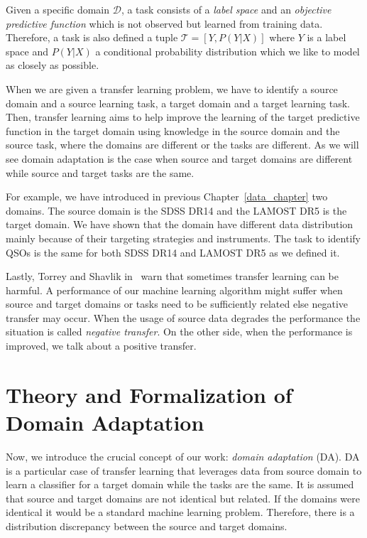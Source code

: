 Given a specific domain \(\mathcal{D}\),
a task consists of a \textit{label space} and an \textit{objective predictive function}
which is not observed but learned from training data.
Therefore, a task is also defined a tuple \(\mathcal{T} = [Y, P(Y | X)]\)
where \(Y\) is a label space
and \(P(Y | X)\) a conditional probability distribution
which we like to model as closely as possible.

When we are given a transfer learning problem,
we have to identify a source domain and a source learning task,
a target domain and a target learning task.
Then, transfer learning aims to help improve the learning of the target predictive function in the target domain
using knowledge in the source domain and the source task,
where the domains are different or the tasks are different.
As we will see domain adaptation is the case
when source and target domains are different
while source and target tasks are the same.~\cite{pan2010}

For example, we have introduced in previous Chapter~\ref{data_chapter}
two domains.
The source domain is the SDSS DR14 and the LAMOST DR5 is the target domain.
We have shown that the domain have different data distribution
mainly because of their targeting strategies and instruments.
The task to identify QSOs is the same for both SDSS DR14 and LAMOST DR5
as we defined it.

Lastly, Torrey and Shavlik in~\cite{torrey2010} warn
that sometimes transfer learning can be harmful.
A performance of our machine learning algorithm might suffer
when source and target domains or tasks need to be sufficiently related
else negative transfer may occur.
When the usage of source data degrades the performance
the situation is called \textit{negative transfer}.
On the other side, when the performance is improved,
we talk about a positive transfer.

\section{Theory and Formalization of Domain Adaptation}

Now, we introduce the crucial concept of our work: \textit{domain adaptation} (DA).
DA is a particular case of transfer learning
that leverages data from source domain to learn a classifier for a target domain while the tasks are the same.
It is assumed that source and target domains are not identical but related.
If the domains were identical it would be a standard machine learning problem.
Therefore, there is a distribution discrepancy between the source and target domains.~\cite{csurka2017}


